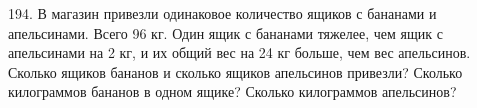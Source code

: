 194. В магазин привезли одинаковое количество ящиков с бананами и апельсинами. Всего 96 кг.  Один ящик с бананами тяжелее, чем ящик с апельсинами на 2 кг, и их общий вес на 24 кг больше, чем вес апельсинов. Сколько ящиков бананов и сколько  ящиков апельсинов привезли? Сколько килограммов бананов в одном ящике? Сколько килограммов апельсинов?\\
